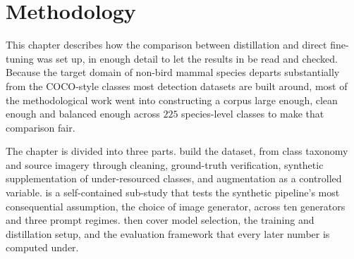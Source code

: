\newpage
\cleardoublepage
\chapter{Methodology}\label{chapter:methods_implementation}

This chapter describes how the comparison between distillation and direct
fine-tuning was set up, in enough detail to let the results in
 be read and checked. Because the target domain of
non-bird mammal species departs substantially from the COCO-style classes most
detection datasets are built around, most of the methodological work went into
constructing a corpus large enough, clean enough and balanced enough across
$225$ species-level classes to make that comparison fair.

The chapter is divided into three parts.
build the dataset, from class taxonomy and source imagery through cleaning,
ground-truth verification, synthetic supplementation of under-resourced classes,
and augmentation as a controlled variable.  is a
self-contained sub-study that tests the synthetic pipeline's most consequential
assumption, the choice of image generator, across ten generators and three
prompt regimes.  then cover
model selection, the training and distillation setup, and the evaluation
framework that every later number is computed under.








